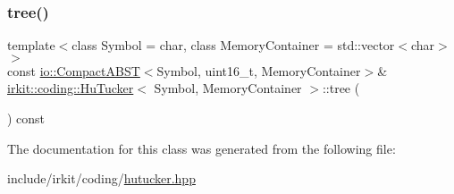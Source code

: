 \mbox{\label{classirkit_1_1coding_1_1HuTucker_a36caf73ad9a33cfe361ae8920c08a751}} 
\subsubsection{\texorpdfstring{tree()}{tree()}}
{\footnotesize\ttfamily template$<$class Symbol  = char, class Memory\+Container  = std\+::vector$<$char$>$$>$ \\
const \mbox{\hyperlink{classirkit_1_1io_1_1CompactABST}{io\+::\+Compact\+A\+B\+ST}}$<$Symbol, uint16\+\_\+t, Memory\+Container$>$\& \mbox{\hyperlink{classirkit_1_1coding_1_1HuTucker}{irkit\+::coding\+::\+Hu\+Tucker}}$<$ Symbol, Memory\+Container $>$\+::tree (\begin{DoxyParamCaption}{ }\end{DoxyParamCaption}) const\hspace{0.3cm}{\ttfamily [inline]}}



The documentation for this class was generated from the following file\+:\begin{DoxyCompactItemize}
\item 
include/irkit/coding/\mbox{\hyperlink{hutucker_8hpp}{hutucker.\+hpp}}\end{DoxyCompactItemize}
